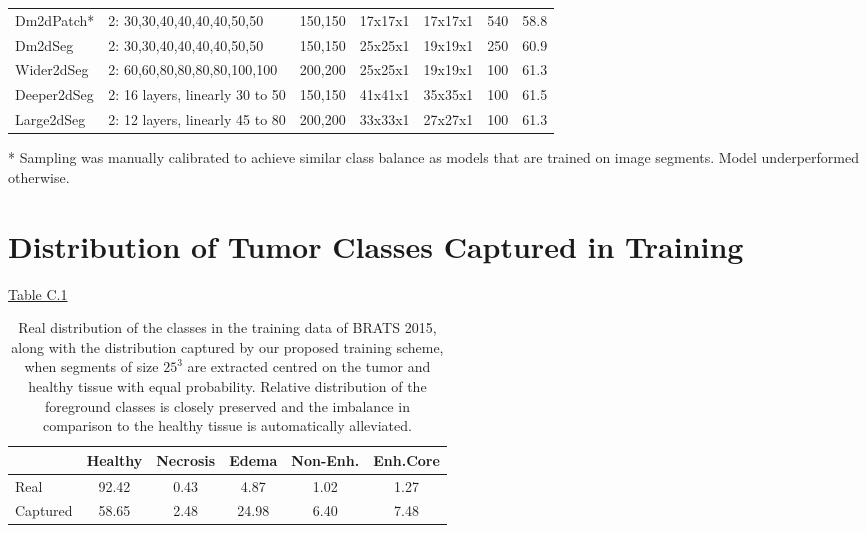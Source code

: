 \begin{table}[!h]
\begin{subtable}{1.0\linewidth}
\begin{threeparttable}
\begin{tabular}{@{}m{1.5cm}m{3.7cm}m{1.2cm}m{1.2cm}m{1.2cm}m{0.8cm}m{1.3cm}}
Dm2dPatch*    	& 2: 30,30,40,40,40,40,50,50      & 150,150    & 17x17x1    & 17x17x1    &540 & 58.8       \\
Dm2dSeg        & 2: 30,30,40,40,40,40,50,50      & 150,150    & 25x25x1    & 19x19x1    &250 & 60.9       \\
Wider2dSeg     & 2: 60,60,80,80,80,80,100,100    & 200,200    & 25x25x1    & 19x19x1    &100 & 61.3       \\
Deeper2dSeg    & 2: 16 layers, linearly 30 to 50 & 150,150    & 41x41x1    & 35x35x1    &100 & 61.5       \\
Large2dSeg  	& 2: 12 layers, linearly 45 to 80 & 200,200    & 33x33x1    & 27x27x1    &100 & 61.3    \\ \bottomrule
\end{tabular}
\begin{tablenotes}
            \item[*] Sampling was manually calibrated to achieve similar class balance as models that are trained on image segments. Model underperformed otherwise.
\end{tablenotes}
\end{threeparttable}
\end{subtable}
\end{table}

\section{Distribution of Tumor Classes Captured in Training}
\label{app:distrTumorClassesTrain}
\setcounter{table}{0}    
\renewcommand\thetable{C.\arabic{table}} 

\hyperref[table:trainingSamplesPercBrats2015Training]{Table C.1}

\begin{table}[!h]
\centering
\scriptsize
\caption{Real distribution of the classes in the training data of BRATS 2015, along with the distribution captured by our proposed training scheme, when segments of size $25^3$ are extracted centred on the tumor and healthy tissue with equal probability. Relative distribution of the foreground classes is closely preserved and the imbalance in comparison to the healthy tissue is automatically alleviated.}
\label{table:trainingSamplesPercBrats2015Training}
\begin{tabular}{@{}lccccc@{}}
\toprule
\multicolumn{1}{c}{} & Healthy		& Necrosis 	& Edema 		& Non-Enh. 	& Enh.Core 	\\ \midrule
Real		 			& 92.42			& 0.43		& 4.87		& 1.02		& 1.27		\\
Captured				& 58.65			& 2.48		& 24.98		& 6.40		& 7.48		\\
\bottomrule
\end{tabular}
\end{table}


